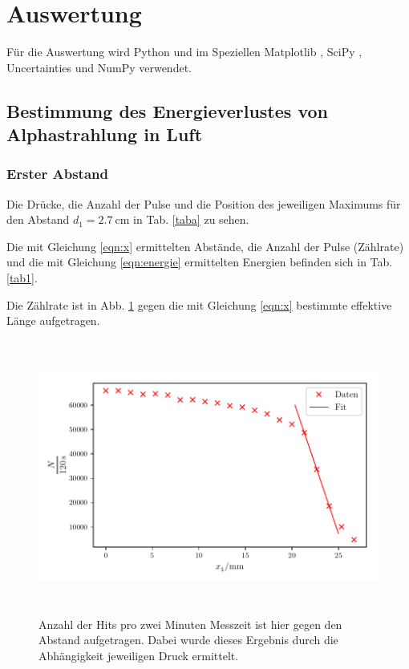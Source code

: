 \section{Auswertung}
\label{sec:Auswertung}

Für die Auswertung wird Python und im Speziellen Matplotlib \cite{matplotlib}, SciPy \cite{scipy}, Uncertainties \cite{uncertainties} und NumPy \cite{numpy} verwendet.

\subsection{Bestimmung des Energieverlustes von Alphastrahlung in Luft}

\subsubsection{Erster Abstand}
Die Drücke, die Anzahl der Pulse und die Position des jeweiligen Maximums für den Abstand $d_1 = \SI{2.7}{\centi\meter}$ in Tab. \ref{taba} zu sehen.
 
 

Die mit Gleichung \eqref{eqn:x} ermittelten Abstände, die Anzahl der Pulse (Zählrate) und die mit Gleichung \eqref{eqn:energie} ermittelten Energien befinden sich in Tab. \ref{tab1}. 

 

\noindent Die Zählrate ist in Abb. \ref{zaehlrate1} gegen die mit Gleichung \eqref{eqn:x} bestimmte effektive Länge aufgetragen.

\begin{figure}
    \centering
    \includegraphics[width=12cm, height=9cm]{build/plota.pdf}
    \caption{Anzahl der Hits pro zwei Minuten Messzeit ist hier gegen den Abstand aufgetragen. Dabei wurde dieses Ergebnis durch die Abhängigkeit jeweiligen Druck ermittelt.}
    \label{zaehlrate1}
\end{figure}

